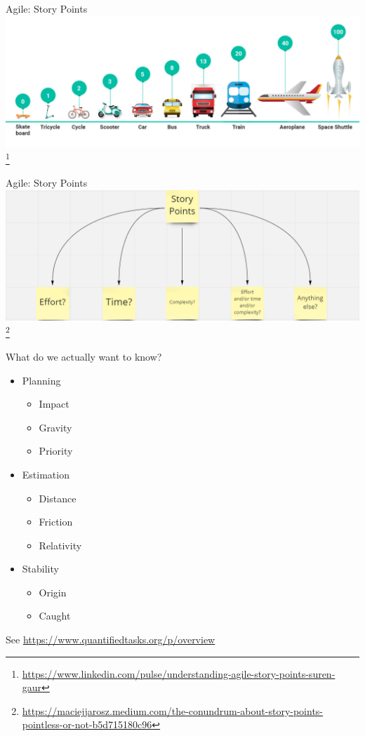 \documentclass[aspectratio=169]{beamer}
\begin{document}
\begin{frame}{Agile: Story Points}
    \centering
    \includegraphics[width=\textwidth,height=0.8\textheight,keepaspectratio]{agile_story_points.jpg} \footnote{\url{https://www.linkedin.com/pulse/understanding-agile-story-points-suren-gaur}}
\end{frame}
\begin{frame}{Agile: Story Points}
    \centering
    \includegraphics[width=\textwidth,height=0.8\textheight,keepaspectratio]{story_points_meaningless.png} \footnote{\url{https://maciejjarosz.medium.com/the-conundrum-about-story-points-pointless-or-not-b5d715180c96}}
\end{frame}
\begin{frame}{What do we actually want to know?}
    \begin{itemize}
        \item Planning
        \begin{itemize}
            \item Impact
            \item Gravity
            \item Priority
        \end{itemize}
        \item Estimation
        \begin{itemize}
            \item Distance
            \item Friction
            \item Relativity
        \end{itemize}
        \item Stability
        \begin{itemize}
            \item Origin
            \item Caught
        \end{itemize}
    \end{itemize}
    See \url{https://www.quantifiedtasks.org/p/overview}
\end{frame}
\end{document}
